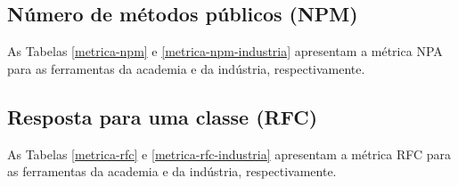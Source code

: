 
\subsection{Número de métodos públicos (NPM)}

As Tabelas \ref{metrica-npm} e \ref{metrica-npm-industria} apresentam a
métrica NPA para as ferramentas da academia e da indústria, respectivamente.



\subsection{Resposta para uma classe (RFC)}

As Tabelas \ref{metrica-rfc} e \ref{metrica-rfc-industria} apresentam a
métrica RFC para as ferramentas da academia e da indústria, respectivamente.


